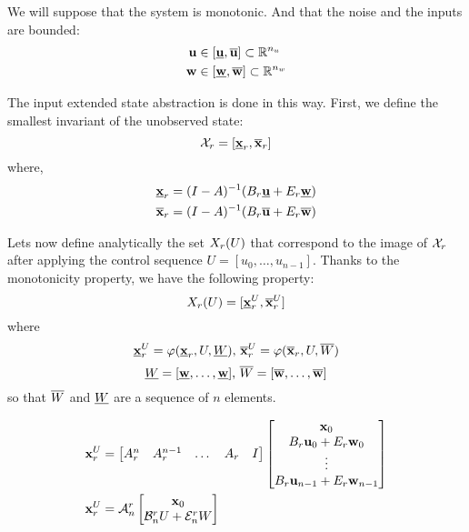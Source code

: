 We will suppose that the system is monotonic. 
And that the noise and the inputs are bounded:
\begin{equation}
\begin{aligned}
 \mathbf{u} &\in [\underline{ \mathbf{u}},\overline{ \mathbf{u}}] \subset \mathbb{R}^{n_u}\\
 \mathbf{w} &\in [\underline{ \mathbf{w}},\overline{ \mathbf{w}}] \subset \mathbb{R}^{n_w}\\
\end{aligned}
\end{equation}

The input extended state abstraction is done in this way. First, we define the smallest invariant of the unobserved state:
$$
\mathcal{X}_r = [\underline{ \mathbf{x}}_r,\overline{ \mathbf{x}}_r]
$$
where,
$$
\begin{aligned}
\underline{ \mathbf{x}}_r &= (I-A)^{-1} (B_r \underline{ \mathbf{u}} + E_r \underline{ \mathbf{w}})\\
\overline{ \mathbf{x}}_r &= (I-A)^{-1} (B_r \overline{ \mathbf{u}} + E_r \overline{ \mathbf{w}})
\end{aligned}
$$

Lets now define analytically the set $X_r(U)$ that correspond to the image of $\mathcal{X}_r$ after applying the control sequence $U = [u_0,\dots,u_{n-1}]$.
Thanks to the monotonicity property, we have the following property:
\newcommand{\xui}{\minf{\x}^U_r}
\newcommand{\xus}{\msup{\x}^U_r}
\newcommand{\xu}{\x^U_r}
$$\Xr(U) = [\xui,\xus]$$
where
$$\xui = \traj (\xrinf,U,\Winf)
\textrm{, }
\xus = \traj (\xrsup,U,\Wsup)$$
$$ \underline{W} = [\underline{ \mathbf{w}},\dots,\underline{ \mathbf{w}}]
\textrm{, }
\overline{W} = [\overline{ \mathbf{w}},\dots,\overline{ \mathbf{w}}]$$
so that $\overline{W}$ and $\underline{W}$ are a sequence of $n$ elements.


\newcommand{\An}{\mathcal{A}^r_n}
\newcommand{\Bn}{\mathcal{B}^r_n}
\newcommand{\En}{\mathcal{E}^r_n}
\begin{align} \label{expr:xur}
\xu &=
\begin{bmatrix}
A_r^n & A_r^{n-1} &\dots & A_r & I
\end{bmatrix}
\begin{bmatrix}
\x_0 \\
B_r \u_0 + E_r \w_0\\
\vdots \\
B_r \u_{n-1} + E_r \w_{n-1}\\
\end{bmatrix}\\
\xu &=
\An
\begin{bmatrix}
\x_0 \\
\Bn U + \En W
\end{bmatrix}
\end{align}

